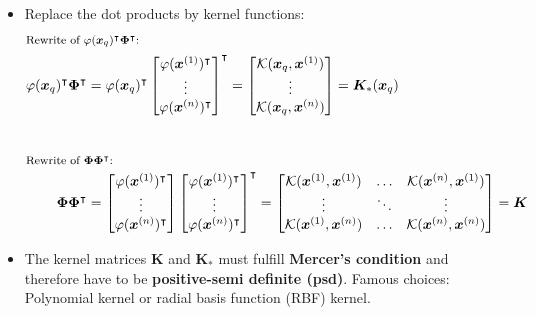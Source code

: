 \begin{frame}
	\begin{itemize}
		\item Replace the dot products by kernel functions:
		\begin{alignat}{2}
		\shortintertext{\footnotesize Rewrite of $\varphi(\bm{x}_q)^{\intercal} \bm{\Phi}^{\intercal}$:}
			\varphi(\bm{x}_q)^{\intercal} \bm{\Phi}^{\intercal} &=
				\varphi(\bm{x}_q)^{\intercal}
				\begin{bmatrix}
					\varphi(\bm{x}^{(1)})^{\intercal} 	\\
					\vdots 						\\
					\varphi(\bm{x}^{(n)})^{\intercal}
				\end{bmatrix}^{\intercal} =
				\begin{bmatrix}
					\mathcal{K}(\bm{x}_q, \bm{x}^{(1)})	\\
					\vdots 						\\
					\mathcal{K}(\bm{x}_q, \bm{x}^{(n)})
				\end{bmatrix} = \bm{K}_*(\bm{x}_q)		\\[8mm]
		\shortintertext{\footnotesize Rewrite of $\bm{\Phi} \bm{\Phi}^{\intercal}$:}
			\bm{\Phi} \bm{\Phi}^{\intercal} &=
				\begin{bmatrix}
					\varphi(\bm{x}^{(1)})^{\intercal} 	\\
					\vdots 						\\
					\varphi(\bm{x}^{(n)})^{\intercal}
				\end{bmatrix}
				\begin{bmatrix}
					\varphi(\bm{x}^{(1)})^{\intercal} 	\\
					\vdots 						\\
					\varphi(\bm{x}^{(n)})^{\intercal}
				\end{bmatrix}^{\intercal} =
				\begin{bmatrix}
					\mathcal{K}(\bm{x}^{(1)}, \bm{x}^{(1)}) 	& \hdots 	& \mathcal{K}(\bm{x}^{(n)}, \bm{x}^{(1)}) \\
					\vdots 							& \ddots 	& \vdots 							\\
					\mathcal{K}(\bm{x}^{(1)}, \bm{x}^{(n)}) 	& \hdots 	& \mathcal{K}(\bm{x}^{(n)}, \bm{x}^{(n)})
				\end{bmatrix} = \bm{K}
		\end{alignat}
		\vspace*{1mm}
		\item The kernel matrices $\bm{K}$ and $\bm{K}_*$ must fulfill \textbf{Mercer's condition} and therefore have to be \textbf{positive-semi definite (psd)}.
			Famous choices: Polynomial kernel or radial basis function (RBF) kernel.
	\end{itemize}
\end{frame}


